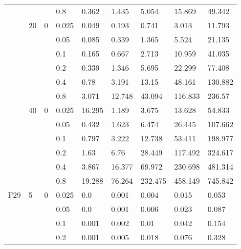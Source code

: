 \begin{longtable}{|l|l|l|l|l|l|l|l|l|}
\cmidrule{4-9} &     &          & 0.8            & 0.362      & 1.435      & 5.054      & 15.869     & 49.342     \\
\cmidrule{2-9} & 20  & 0        & 0.025          & 0.049      & 0.193      & 0.741      & 3.013      & 11.793     \\
\cmidrule{4-9} &     &          & 0.05           & 0.085      & 0.339      & 1.365      & 5.524      & 21.135     \\
\cmidrule{4-9} &     &          & 0.1            & 0.165      & 0.667      & 2.713      & 10.959     & 41.035     \\
\cmidrule{4-9} &     &          & 0.2            & 0.339      & 1.346      & 5.695      & 22.299     & 77.408     \\
\cmidrule{4-9} &     &          & 0.4            & 0.78       & 3.191      & 13.15      & 48.161     & 130.882    \\
\cmidrule{4-9} &     &          & 0.8            & 3.071      & 12.748     & 43.094     & 116.833    & 236.57     \\
\cmidrule{2-9} & 40  & 0        & 0.025          & 16.295     & 1.189      & 3.675      & 13.628     & 54.833     \\
\cmidrule{4-9} &     &          & 0.05           & 0.432      & 1.623      & 6.474      & 26.445     & 107.662    \\
\cmidrule{4-9} &     &          & 0.1            & 0.797      & 3.222      & 12.738     & 53.411     & 198.977    \\
\cmidrule{4-9} &     &          & 0.2            & 1.63       & 6.76       & 28.449     & 117.492    & 324.617    \\
\cmidrule{4-9} &     &          & 0.4            & 3.867      & 16.377     & 69.972     & 230.698    & 481.314    \\
\cmidrule{4-9} &     &          & 0.8            & 19.288     & 76.264     & 232.475    & 458.149    & 745.842    \\ \midrule
F29            & 5   & 0        & 0.025          & 0.0        & 0.001      & 0.004      & 0.015      & 0.053      \\
\cmidrule{4-9} &     &          & 0.05           & 0.0        & 0.001      & 0.006      & 0.023      & 0.087      \\
\cmidrule{4-9} &     &          & 0.1            & 0.001      & 0.002      & 0.01       & 0.042      & 0.154      \\
\cmidrule{4-9} &     &          & 0.2            & 0.001      & 0.005      & 0.018      & 0.076      & 0.328      \\

\end{longtable}
